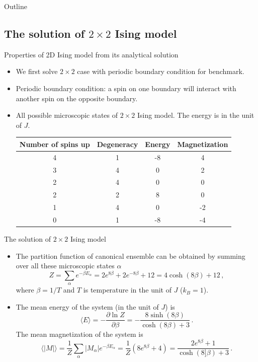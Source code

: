 \documentclass{beamer}
\begin{document}
\begin{frame}{Outline}
\tableofcontents[currentsection]
\end{frame}

\subsection{The solution of $2 \times 2$ Ising model}
\begin{frame}{Properties of 2D Ising model from its analytical solution}
\begin{itemize}
	\item<1-> We first solve $2 \times 2$ case with periodic boundary condition for benchmark. 
	\item<2-> Periodic boundary condition: a spin on one boundary will interact with another spin on the opposite boundary. 
	\item<3-> All possible microscopic states of $2 \times 2$ Ising model. The energy is in the unit of $J$. 
	\begin{table}
		\centering
		\begin{tabular}{cccc}
			\hline
			\hline 
			Number of spins up & Degeneracy & Energy & Magnetization \\ 
			\hline
			4 & 1 & -8 & 4 \\  
			3 & 4 & 0 & 2 \\ 
			2 & 4 & 0 & 0 \\ 
			2 & 2 & 8 & 0 \\ 
			1 & 4 & 0 & -2 \\ 
			0 & 1 & -8 & -4 \\ 
			\hline 
			\hline
		\end{tabular}
		\label{tab:2times2} 
	\end{table}
\end{itemize}
\end{frame}

\begin{frame}{The solution of $2 \times 2$ Ising model}
\begin{itemize}
	\item<1-> The partition function of canonical ensemble can be obtained by summing over all these microscopic states $\alpha$ 
	\begin{equation}
	Z=\sum_{\alpha}e^{-\beta E_\alpha}=2e^{8\beta}+2e^{-8\beta}+12=4\cosh\left(8\beta\right)+12\,,
	\end{equation}
	where $\beta=1/T$ and $T$ is temperature in the unit of $J$ ($k_B=1$). 
	\item<2-> The mean energy of the system (in the unit of $J$) is 
	\begin{equation}
	\langle E\rangle=-\frac{\partial \ln Z}{\partial \beta}=-\frac{8\sinh\left(8\beta\right)}{\cosh\left(8\beta\right)+3}\,. 
	\end{equation}
	The mean magnetization of the system is 
	\begin{equation}
	\langle|M|\rangle=\frac{1}{Z}\sum_{\alpha} |M_\alpha| e^{-\beta E_\alpha}=\frac{1}{Z}\left(8e^{8\beta}+4\right)
	=\frac{2e^{8\beta}+1}{\cosh\left(8]\beta\right)+3}\,. 
	\end{equation}
\end{itemize}
\end{frame}
\end{document}
